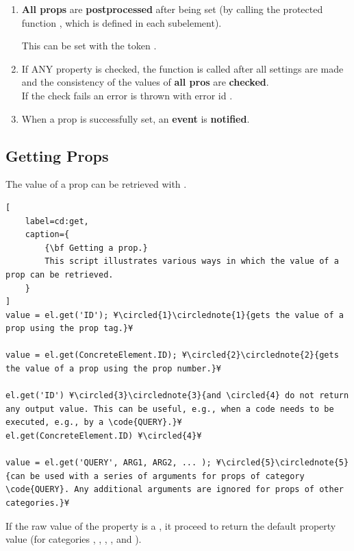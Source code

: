 \documentclass{tufte-handout}
\begin{document}
\begin{enumerate}
\item{} {\bf All props} are {\bf postprocessed} after being set (by calling the protected function , which is defined in each subelement).
	
	This can be set with the token .

\item{} If ANY property is checked, the function  is called after all settings are made and the consistency of the values of {\bf all pros} are {\bf checked}.\\
	If the check fails an error is thrown with error id .
	
\item{} When a prop is successfully set, an {\bf event}  is {\bf notified}.

\end{enumerate} 

\subsection{Getting Props}

The value of a prop can be retrieved with .

\begin{lstlisting}[
	label=cd:get,
	caption={
		{\bf Getting a prop.}
		This script illustrates various ways in which the value of a prop can be retrieved.
	}
]
value = el.get('ID'); ¥\circled{1}\circlednote{1}{gets the value of a prop using the prop tag.}¥

value = el.get(ConcreteElement.ID); ¥\circled{2}\circlednote{2}{gets the value of a prop using the prop number.}¥

el.get('ID') ¥\circled{3}\circlednote{3}{and \circled{4} do not return any output value. This can be useful, e.g., when a code needs to be executed, e.g., by a \code{QUERY}.}¥
el.get(ConcreteElement.ID) ¥\circled{4}¥

value = el.get('QUERY', ARG1, ARG2, ... ); ¥\circled{5}\circlednote{5}{can be used with a series of arguments for props of category \code{QUERY}. Any additional arguments are ignored for props of other categories.}¥
\end{lstlisting}

If the raw value of the property is a , it proceed to return the default property value (for categories , , , , and ).
 
\end{document}
